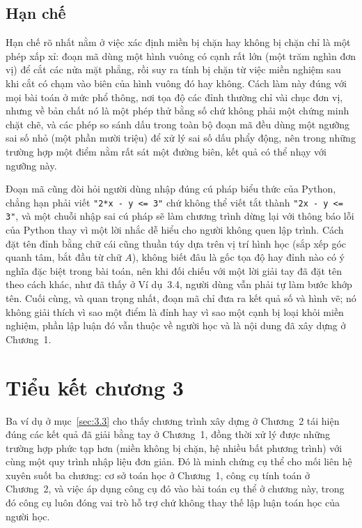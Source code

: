 \documentclass[12pt,a4paper]{report}
\begin{document}
\subsection{Hạn chế}

Hạn chế rõ nhất nằm ở việc xác định miền bị chặn hay không bị chặn chỉ là một phép xấp xỉ: đoạn mã dùng một hình vuông có cạnh rất lớn (một trăm nghìn đơn vị) để cắt các nửa mặt phẳng, rồi suy ra tính bị chặn từ việc miền nghiệm sau khi cắt có chạm vào biên của hình vuông đó hay không. Cách làm này đúng với mọi bài toán ở mức phổ thông, nơi tọa độ các đỉnh thường chỉ vài chục đơn vị, nhưng về bản chất nó là một phép thử bằng số chứ không phải một chứng minh chặt chẽ, và các phép so sánh dấu trong toàn bộ đoạn mã đều dùng một ngưỡng sai số nhỏ (một phần mười triệu) để xử lý sai số dấu phẩy động, nên trong những trường hợp một điểm nằm rất sát một đường biên, kết quả có thể nhạy với ngưỡng này.

Đoạn mã cũng đòi hỏi người dùng nhập đúng cú pháp biểu thức của Python, chẳng hạn phải viết \texttt{"2*x - y <= 3"} chứ không thể viết tắt thành \texttt{"2x - y <= 3"}, và một chuỗi nhập sai cú pháp sẽ làm chương trình dừng lại với thông báo lỗi của Python thay vì một lời nhắc dễ hiểu cho người không quen lập trình. Cách đặt tên đỉnh bằng chữ cái cũng thuần túy dựa trên vị trí hình học (sắp xếp góc quanh tâm, bắt đầu từ chữ $A$), không biết đâu là gốc tọa độ hay đỉnh nào có ý nghĩa đặc biệt trong bài toán, nên khi đối chiếu với một lời giải tay đã đặt tên theo cách khác, như đã thấy ở Ví dụ~3.4, người dùng vẫn phải tự làm bước khớp tên. Cuối cùng, và quan trọng nhất, đoạn mã chỉ đưa ra kết quả số và hình vẽ; nó không giải thích vì sao một điểm là đỉnh hay vì sao một cạnh bị loại khỏi miền nghiệm, phần lập luận đó vẫn thuộc về người học và là nội dung đã xây dựng ở Chương~1.

\section{Tiểu kết chương 3}
\label{sec:3.6}

Ba ví dụ ở mục~\ref{sec:3.3} cho thấy chương trình xây dựng ở Chương~2 tái hiện đúng các kết quả đã giải bằng tay ở Chương~1, đồng thời xử lý được những trường hợp phức tạp hơn (miền không bị chặn, hệ nhiều bất phương trình) với cùng một quy trình nhập liệu đơn giản. Đó là minh chứng cụ thể cho mối liên hệ xuyên suốt ba chương: cơ sở toán học ở Chương~1, công cụ tính toán ở Chương~2, và việc áp dụng công cụ đó vào bài toán cụ thể ở chương này, trong đó công cụ luôn đóng vai trò hỗ trợ chứ không thay thế lập luận toán học của người học.

\end{document}

